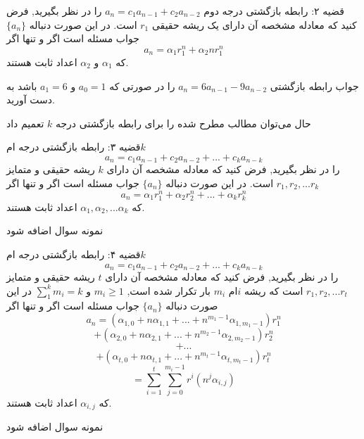 \begin{THEOREM}
    \p
    قضیه ۲:
    رابطه‌ بازگشتی درجه دوم
    $a_n=c_1 a_{n-1}+c_2 a_{n-2}$
    را در نظر بگیرید, فرض کنید که معادله مشخصه آن دارای یک ریشه حقیقی 
    $r_1$
    است.
    در این صورت دنباله 
    $\{a_n\}$
    جواب مسئله است اگر و تنها اگر
    \[a_n=\alpha_1 r_1^n+\alpha_2 nr_1^n\]
    که
    $\alpha_1$
    و
    $\alpha_2$
    اعداد ثابت هستند.

\end{THEOREM}
\begin{PROBLEM}
    \p
    جواب رابطه‌ بازگشتی 
    $a_n=6a_{n-1}-9a_{n-2}$
    را در صورتی که
    $a_0=1$
    و
    $a_1=6$
    باشد به دست آورید.
\end{PROBLEM}
\p
حال می‌توان مطالب مطرح شده را برای رابطه‌ بازگشتی درجه
$k$
تعمیم داد
\begin{THEOREM}
    \p
    قضیه ۳:
    رابطه‌ بازگشتی درجه 
    ام$k$
    \[a_n=c_{1}a_{n-1}+c_{2}a_{n-2}+...+c_{k}a_{n-k}\]
    را در نظر بگیرید, فرض کنید که معادله مشخصه آن دارای 
    $k$
    ریشه حقیقی و متمایز 
    $r_1, r_2, ...r_k $
    است.
    در این صورت دنباله 
    $\{a_n\}$
    جواب مسئله است اگر و تنها اگر
    \[a_n=\alpha_1 r_1^n+\alpha_2 r_2^n+...+\alpha_k r_k^n\]
    که
    $\alpha_1,\alpha_2,...\alpha_k$
    اعداد ثابت هستند.

\end{THEOREM}

\begin{PROBLEM}
    نمونه سوال اضافه شود
\end{PROBLEM}

\begin{THEOREM}
    \p
    قضیه ۴:
    رابطه‌ بازگشتی درجه 
    ام$k$
    \[a_n=c_{1}a_{n-1}+c_{2}a_{n-2}+...+c_{k}a_{n-k}\]
    را در نظر بگیرید, فرض کنید که معادله مشخصه آن دارای 
    $t$
    ریشه حقیقی و متمایز 
    $r_1, r_2, ...r_t $
    است که ریشه
    $i$ام 
    $m_i$
    بار تکرار شده است,  
    $m_i \geq 1$
    و
    $\sum_1^k m_i=k$
    در این صورت دنباله 
    $\{a_n\}$
    جواب مسئله است اگر و تنها اگر
    \[a_n=(\alpha_{1,0}+ n\alpha_{1,1}+...+n^{m_1-1}\alpha_{1,m_1-1})r_1^n\]
    \[+(\alpha_{2,0}+ n\alpha_{2,1}+...+n^{m_2-1}\alpha_{2,m_2-1})r_2^n\]
    \[+...\]
    \[+(\alpha_{t,0}+ n\alpha_{t,1}+...+n^{m_t-1}\alpha_{t,m_t-1})r_t^n\]
    \[=\sum_{i=1}^t\sum_{j=0}^{m_i-1}r^i(n^j\alpha_{i,j})\]
    که
    $\alpha_{i,j}$
    اعداد ثابت هستند.

\end{THEOREM}

\begin{PROBLEM}
    نمونه سوال اضافه شود
\end{PROBLEM}
